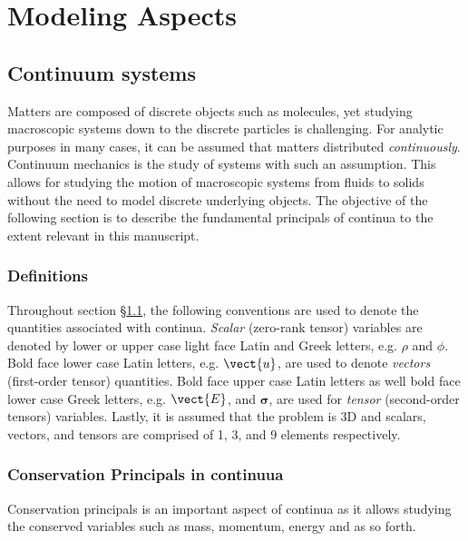 \chapter{Modeling Aspects}
\label{chap:modeling}
\section{Continuum systems}\label{sec:continua_Model}
Matters are composed of discrete objects such as molecules, yet studying macroscopic systems down to the discrete particles is challenging. For analytic purposes in many cases, it can be assumed that matters  distributed  \textit{continuously}.  Continuum mechanics is the study of systems with such an assumption. This allows for studying the motion of macroscopic systems from fluids to solids without the need to model discrete underlying objects. The objective of the following section is to describe the fundamental principals of continua to the extent relevant in this manuscript.

\subsection{Definitions}
Throughout section \S\ref{sec:continua_Model}, the following conventions are used to denote the quantities associated with continua. \textit{Scalar} (zero-rank tensor) variables are denoted by lower or upper case light face Latin and Greek letters, e.g. $\rho$ and $\phi$. Bold face lower case Latin letters, e.g. $\vect{u}$, are used to denote \textit{vectors} (first-order tensor) quantities. Bold face upper case Latin letters as well bold face lower case Greek letters, e.g. $\vect{E}$,  and $\bm \sigma$, are used for \textit{tensor} (second-order tensors) variables. Lastly, it is assumed that the problem is 3D and scalars, vectors, and tensors are comprised of 1, 3, and 9 elements respectively. 

\subsection{Conservation Principals in continuua}
Conservation principals is an important aspect of continua as it allows studying the conserved variables such as mass, momentum, energy and as so forth.

